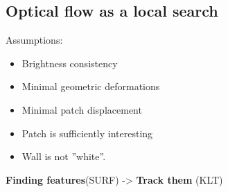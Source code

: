 \subsection{Optical flow as a local search}
Assumptions:
\begin{itemize}
  \item Brightness consistency
  \item Minimal geometric deformations
  \item Minimal patch displacement
  \item Patch is sufficiently interesting
  \item Wall is not ''white''.
\end{itemize}

\textbf{Finding features}(SURF) -> \textbf{Track them} (KLT)
